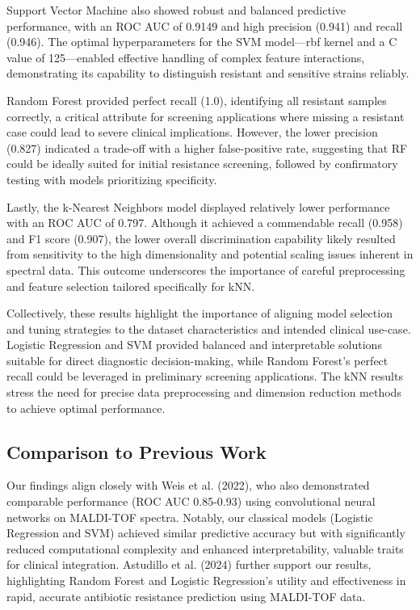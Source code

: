 \documentclass{article}
\begin{document}
Support Vector Machine also showed robust and balanced predictive performance, with an ROC AUC of 0.9149 and high precision (0.941) and recall (0.946). The optimal hyperparameters for the SVM model—rbf kernel and a C value of 125—enabled effective handling of complex feature interactions, demonstrating its capability to distinguish resistant and sensitive strains reliably.

Random Forest provided perfect recall (1.0), identifying all resistant samples correctly, a critical attribute for screening applications where missing a resistant case could lead to severe clinical implications. However, the lower precision (0.827) indicated a trade-off with a higher false-positive rate, suggesting that RF could be ideally suited for initial resistance screening, followed by confirmatory testing with models prioritizing specificity.

Lastly, the k-Nearest Neighbors model displayed relatively lower performance with an ROC AUC of 0.797. Although it achieved a commendable recall (0.958) and F1 score (0.907), the lower overall discrimination capability likely resulted from sensitivity to the high dimensionality and potential scaling issues inherent in spectral data. This outcome underscores the importance of careful preprocessing and feature selection tailored specifically for kNN.

Collectively, these results highlight the importance of aligning model selection and tuning strategies to the dataset characteristics and intended clinical use-case. Logistic Regression and SVM provided balanced and interpretable solutions suitable for direct diagnostic decision-making, while Random Forest's perfect recall could be leveraged in preliminary screening applications. The kNN results stress the need for precise data preprocessing and dimension reduction methods to achieve optimal performance.

\subsection{Comparison to Previous Work}

Our findings align closely with Weis et al. (2022), who also demonstrated comparable performance (ROC AUC 0.85-0.93) using convolutional neural networks on MALDI-TOF spectra. Notably, our classical models (Logistic Regression and SVM) achieved similar predictive accuracy but with significantly reduced computational complexity and enhanced interpretability, valuable traits for clinical integration. Astudillo et al. (2024) further support our results, highlighting Random Forest and Logistic Regression's utility and effectiveness in rapid, accurate antibiotic resistance prediction using MALDI-TOF data.
\end{document}
